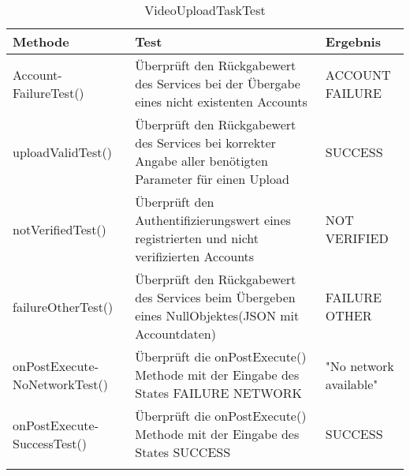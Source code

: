 \begin{longtable}{p{} | p{} | p{}}
\hline
  \textbf{Methode} & \textbf{Test} & \textbf{Ergebnis}\\
  \hline
  Account- \newline FailureTest() & Überprüft den Rückgabewert des Services bei der Übergabe eines nicht existenten Accounts & ACCOUNT FAILURE \\
  \hline
  uploadValidTest() & Überprüft den Rückgabewert des Services bei korrekter Angabe aller benötigten Parameter für einen Upload  & SUCCESS \\
  \hline
  notVerifiedTest() & Überprüft den Authentifizierungswert eines registrierten und nicht verifizierten Accounts & NOT VERIFIED \\
  \hline
  failureOtherTest() & Überprüft den Rückgabewert des Services beim Übergeben eines NullObjektes(JSON mit Accountdaten) & FAILURE OTHER \\
  \hline
   onPostExecute- \newline NoNetworkTest() & Überprüft die onPostExecute() Methode mit der Eingabe des States FAILURE NETWORK & "No network available" \\
  \hline
  onPostExecute- \newline SuccessTest() & Überprüft die onPostExecute() Methode mit der Eingabe des States SUCCESS & SUCCESS \\
  \hline
  \caption{VideoUploadTaskTest}
 \end{longtable}
 
 
                                                      
